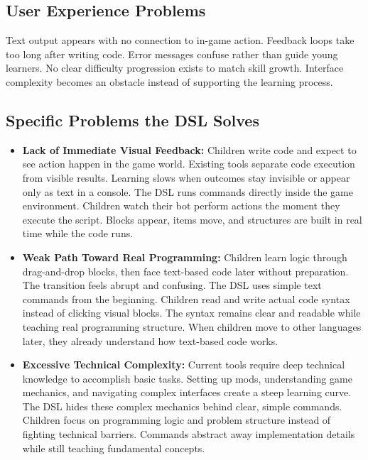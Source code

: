 \subsection{User Experience Problems}

Text output appears with no connection to in-game action. 
Feedback loops take too long after writing code. 
Error messages confuse rather than guide young learners. 
No clear difficulty progression exists to match skill growth. 
Interface complexity becomes an obstacle instead of supporting the learning process.

\subsection{Specific Problems the DSL Solves}

\begin{itemize}
    \item[\textbf{--}] \textbf{Lack of Immediate Visual Feedback:} 
    Children write code and expect to see action happen in the game world. 
    Existing tools separate code execution from visible results. 
    Learning slows when outcomes stay invisible or appear only as text in a console. 
    The DSL runs commands directly inside the game environment. 
    Children watch their bot perform actions the moment they execute the script. 
    Blocks appear, items move, and structures are built in real time while the code runs.

    \item[\textbf{--}] \textbf{Weak Path Toward Real Programming:} 
    Children learn logic through drag-and-drop blocks, then face text-based code later without preparation. 
    The transition feels abrupt and confusing. 
    The DSL uses simple text commands from the beginning. 
    Children read and write actual code syntax instead of clicking visual blocks. 
    The syntax remains clear and readable while teaching real programming structure. 
    When children move to other languages later, they already understand how text-based code works.

    \item[\textbf{--}] \textbf{Excessive Technical Complexity:} 
    Current tools require deep technical knowledge to accomplish basic tasks. 
    Setting up mods, understanding game mechanics, and navigating complex interfaces create a steep learning curve. 
    The DSL hides these complex mechanics behind clear, simple commands. 
    Children focus on programming logic and problem structure instead of fighting technical barriers. 
    Commands abstract away implementation details while still teaching fundamental concepts.


\end{itemize}
